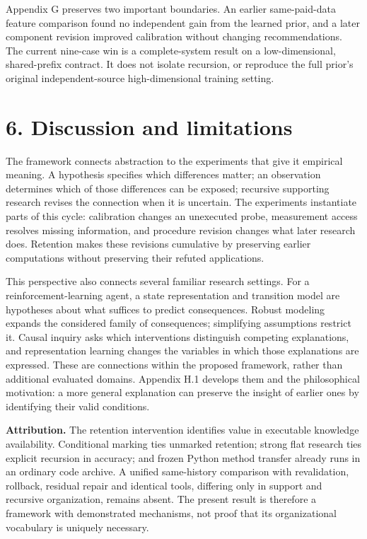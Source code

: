 \documentclass[11pt,a4paper]{article}
\begin{document}
Appendix G preserves two important boundaries. An earlier same-paid-data feature comparison found no independent gain from the learned prior, and a later component revision improved calibration without changing recommendations. The current nine-case win is a complete-system result on a low-dimensional, shared-prefix contract. It does not isolate recursion, or reproduce the full prior's original independent-source high-dimensional training setting.


\section*{6. Discussion and limitations}

The framework connects abstraction to the experiments that give it empirical meaning. A hypothesis specifies which differences matter; an observation determines which of those differences can be exposed; recursive supporting research revises the connection when it is uncertain. The experiments instantiate parts of this cycle: calibration changes an unexecuted probe, measurement access resolves missing information, and procedure revision changes what later research does. Retention makes these revisions cumulative by preserving earlier computations without preserving their refuted applications.


This perspective also connects several familiar research settings. For a reinforcement-learning agent, a state representation and transition model are hypotheses about what suffices to predict consequences. Robust modeling expands the considered family of consequences; simplifying assumptions restrict it. Causal inquiry asks which interventions distinguish competing explanations, and representation learning changes the variables in which those explanations are expressed. These are connections within the proposed framework, rather than additional evaluated domains. Appendix H.1 develops them and the philosophical motivation: a more general explanation can preserve the insight of earlier ones by identifying their valid conditions.


\textbf{Attribution.} The retention intervention identifies value in executable knowledge availability. Conditional marking ties unmarked retention; strong flat research ties explicit recursion in accuracy; and frozen Python method transfer already runs in an ordinary code archive. A unified same-history comparison with revalidation, rollback, residual repair and identical tools, differing only in support and recursive organization, remains absent. The present result is therefore a framework with demonstrated mechanisms, not proof that its organizational vocabulary is uniquely necessary.
\end{document}
